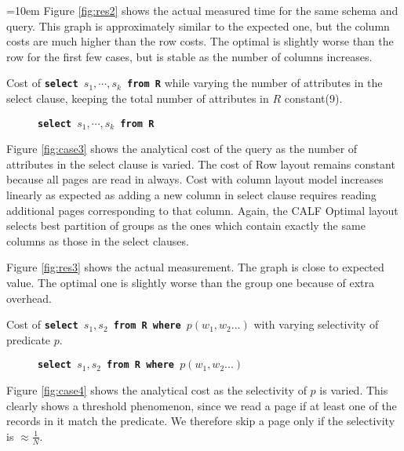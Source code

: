 \documentclass[twocolumn,11pt]{article}
\newcommand{\sql}[1]{{\tt \textbf{#1}}}
\begin{document}
\begin{list}{}{\leftmargin=1em}{\rightmargin=10em}
	Figure \ref{fig:res2} shows the actual measured time for the same schema and query. This graph is
	approximately similar to the expected one, but the column costs are much higher than the row costs.
	The optimal is slightly worse than the row for the first few cases, but is stable as the number
	of columns increases.

	\item Cost of \sql{select $s_1,\cdots,s_k$ from R} while
	varying the number of attributes in the select clause, keeping the
	total number of attributes in $R$ constant(9).

	\begin{figure*}[ht]
		\caption{\sql{select $s_1,\cdots,s_k$ from R}}
	\end{figure*}

	Figure \ref{fig:case3} shows the analytical cost of the query as the number of
	attributes in the select clause is varied.
	The cost of Row layout remains constant because all pages are read in always. Cost with column 
	layout model increases linearly as expected as adding a new column in select clause requires 
	reading additional pages corresponding to that column. Again, the CALF Optimal layout selects 
	best partition of groups as the ones which contain exactly the same columns
	as those in the select clauses.

	Figure \ref{fig:res3} shows the actual measurement. The graph is close to expected
	value. The optimal one is slightly worse than the group one because of extra
	overhead.

	\item Cost of \sql{select $s_1,s_2$ from R where $p(w_1,w_2...)$}
	with varying selectivity of predicate $p$.

	\begin{figure*}[ht]
		\caption{\sql{select $s_1,s_2$ from R where $p(w_1,w_2...)$}}
	\end{figure*}

	Figure \ref{fig:case4} shows the analytical cost as the selectivity of
	$p$ is varied. This clearly shows a threshold phenomenon, since we
	read a page if at least one of the records in it match the predicate.
	We therefore skip a page only if the selectivity is $\approx \frac{1}{N}$.
	

\end{list}
\end{document}

